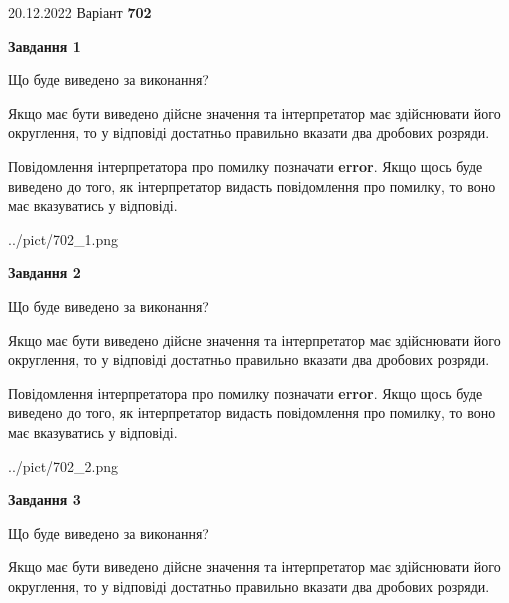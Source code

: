 \documentclass[12pt, ukrainian]{article}
\begin{document}
{20.12.2022 Варіант \No \textbf { 702 }\par}
{
\begin {Large}

{\begin {center}\textbf{Завдання 1}\end {center}}\par
Що буде виведено за виконання? \par

Якщо має бути виведено дійсне значення та інтерпретатор має здійснювати його округлення, 
то у відповіді достатньо правильно вказати два дробових розряди.

Повідомлення інтерпретатора про помилку позначати \textbf{error}.
Якщо щось буде виведено до того, як інтерпретатор видасть повідомлення про помилку, 
то воно має вказуватись у відповіді. \par

\begin{center}
	{../pict/702_1.png}
\end{center}
\newpage

{\begin {center}\textbf{Завдання 2}\end {center}}\par
Що буде виведено за виконання? \par

Якщо має бути виведено дійсне значення та інтерпретатор має здійснювати його округлення, 
то у відповіді достатньо правильно вказати два дробових розряди.

Повідомлення інтерпретатора про помилку позначати \textbf{error}.
Якщо щось буде виведено до того, як інтерпретатор видасть повідомлення про помилку, 
то воно має вказуватись у відповіді. \par

\begin{center}
	{../pict/702_2.png}
\end{center}
\newpage

{\begin {center}\textbf{Завдання 3}\end {center}}\par
Що буде виведено за виконання? \par

Якщо має бути виведено дійсне значення та інтерпретатор має здійснювати його округлення, 
то у відповіді достатньо правильно вказати два дробових розряди.


\end{Large}}
\end{document}
